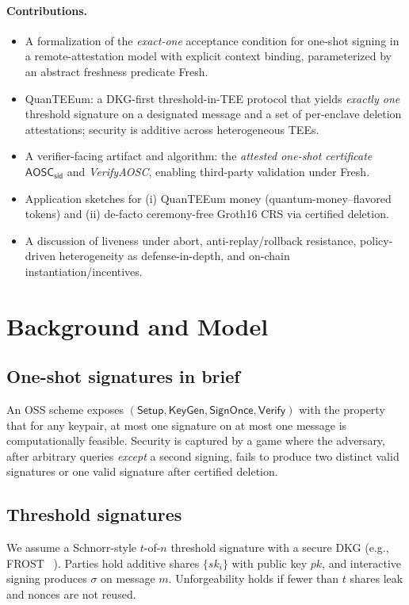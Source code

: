 \documentclass[runningheads,orivec]{llncs}
\newcommand{\prot}{\textsf{QuanTEEum}}
\newcommand{\sid}{\mathsf{sid}}
\newcommand{\oss}{\textsf{OSS}}
\begin{document}
\paragraph{Contributions.}
\begin{itemize}[leftmargin=*,itemsep=0.25em,topsep=0.25em]
  \item A formalization of the \emph{exact-one} acceptance condition for one-shot signing in a remote-attestation model with explicit context binding, parameterized by an abstract freshness predicate \textsf{Fresh}.
  \item \prot{}: a DKG-first threshold-in-TEE protocol that yields \emph{exactly one} threshold signature on a designated message and a set of per-enclave deletion attestations; security is additive across heterogeneous TEEs.
  \item A verifier-facing artifact and algorithm: the \emph{attested one-shot certificate} $\mathsf{AOSC}_\sid$ and \emph{VerifyAOSC}, enabling third-party validation under \textsf{Fresh}.
  \item Application sketches for (i) QuanTEEum money (quantum-money–flavored tokens) and (ii) de-facto ceremony-free Groth16 CRS via certified deletion.
  \item A discussion of liveness under abort, anti-replay/rollback resistance, policy-driven heterogeneity as defense-in-depth, and on-chain instantiation/incentives.
\end{itemize}

\section{Background and Model}
\subsection{One-shot signatures in brief}
An \oss{} scheme exposes $(\mathsf{Setup},\mathsf{KeyGen},\mathsf{SignOnce},\mathsf{Verify})$ with the property that for any keypair, at most one signature on at most one message is computationally feasible. Security is captured by a game where the adversary, after arbitrary queries \emph{except} a second signing, fails to produce two distinct valid signatures or one valid signature after certified deletion.

\subsection{Threshold signatures}
We assume a Schnorr-style $t$-of-$n$ threshold signature with a secure DKG (e.g., FROST ~\cite{komlo2020frost}). Parties hold additive shares $\{sk_i\}$ with public key $pk$, and interactive signing produces $\sigma$ on message $m$. Unforgeability holds if fewer than $t$ shares leak and nonces are not reused.
\end{document}
